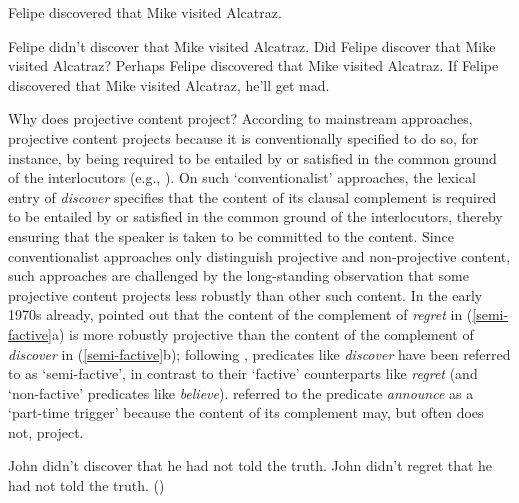 \documentclass[11pt,fleqn]{article}
\newcommand{\6}{\mbox{$[\hspace*{-.6mm}[$}}
\newcommand{\9}{\mbox{$]\hspace*{-.6mm}]$}}
\begin{document}
\begin{exe}
\ex\label{eng1}  Felipe discovered that Mike visited Alcatraz.

\ex\label{eng2}
\begin{xlist} 
\ex Felipe didn't discover that Mike visited Alcatraz.
\ex Did Felipe discover that Mike visited Alcatraz?
\ex Perhaps Felipe discovered that Mike visited Alcatraz.
\ex If Felipe discovered that Mike visited Alcatraz, he'll get mad.
\end{xlist}
\end{exe}

Why does projective content project? According to mainstream approaches, projective content projects because it is conventionally specified to do so, for instance, by being required to be entailed by or satisfied in the common ground of the interlocutors (e.g., \citealt{heim83,vds92,geurts99}). On such `conventionalist' approaches, the lexical entry of {\em discover} specifies that the content of its clausal complement is required to be entailed by or satisfied in the common ground of the interlocutors, thereby ensuring that the speaker is taken to be committed to the content. Since conventionalist approaches only distinguish projective and non-projective content, such approaches are challenged by the long-standing observation that some projective content projects less robustly than other such content. In the early 1970s already, \citet{karttunen71b} pointed out that the content of the complement of {\em regret} in (\ref{semi-factive}a) is more robustly projective than the content of the complement of {\em discover} in (\ref{semi-factive}b); following \citealt{karttunen71b}, predicates like {\em discover} have been referred to as `semi-factive', in contrast to their `factive' counterparts like {\em regret} (and `non-factive' predicates like {\em believe}). \citet{schlenker10} referred to the predicate {\em announce} as a `part-time trigger' because the content of its complement may, but often does not, project.

\begin{exe}
\ex\label{semi-factive}
\begin{xlist}
\ex John didn't discover that he had not told the truth.  
\ex John didn't regret that he had not told the truth.
\hfill (\citealt[63]{karttunen71b})

\end{xlist}
\end{exe}
\end{document}

